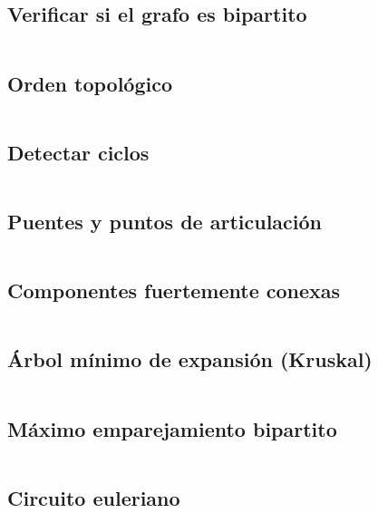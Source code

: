 \documentclass[11pt]{article}
\begin{document}
		\subsection{Verificar si el grafo es bipartito}
		\inputminted[tabsize=2,breaklines,firstline=202,lastline=224,fontsize=\small]{c++}{graph.cpp}
		
		\subsection{Orden topológico}
		\inputminted[tabsize=2,breaklines,firstline=226,lastline=252,fontsize=\small]{c++}{graph.cpp}

		\subsection{Detectar ciclos}
		\inputminted[tabsize=2,breaklines,firstline=254,lastline=274,fontsize=\small]{c++}{graph.cpp}
		
		\subsection{Puentes y puntos de articulación}
		\inputminted[tabsize=2,breaklines,firstline=276,lastline=304,fontsize=\small]{c++}{graph.cpp}
		
		\subsection{Componentes fuertemente conexas}
		\inputminted[tabsize=2,breaklines,firstline=306,lastline=335,fontsize=\small]{c++}{graph.cpp}
		
		\subsection{Árbol mínimo de expansión (Kruskal)}
		\inputminted[tabsize=2,breaklines,firstline=337,lastline=353,fontsize=\small]{c++}{graph.cpp}
		
		\subsection{Máximo emparejamiento bipartito}
		\inputminted[tabsize=2,breaklines,firstline=355,lastline=409,fontsize=\small]{c++}{graph.cpp}
		
		\subsection{Circuito euleriano}
		
\end{document}
